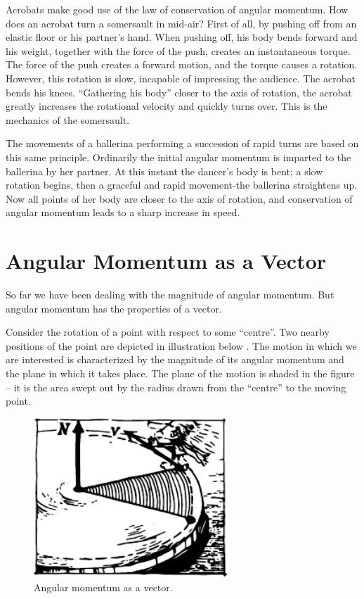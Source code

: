 Acrobats make good use of the law of conservation of angular momentum. How does an acrobat turn a somersault in mid-air? First of all, by pushing off from an elastic floor or his partner's hand. When pushing off, his body bends forward and his weight, together with the force of the push, creates an instantaneous torque. The force of the push creates a forward motion, and the torque causes a rotation. However, this rotation is slow, incapable of impressing the audience. The acrobat bends his knees. ``Gathering his body'' closer to the axis of rotation, the acrobat greatly increases the rotational velocity and quickly turns over. This is the mechanics of the somersault.

The movements of a ballerina performing a succession of rapid turns are based on this same principle. Ordinarily the initial angular momentum is imparted to the ballerina by her partner. At this instant the dancer's body is bent; a slow rotation begins, then a graceful and rapid movement-the ballerina straightens up. Now all points of her body are closer to the axis of rotation, and conservation of angular momentum leads to a sharp increase in speed.


\section{Angular Momentum as a Vector}
So far we have been dealing with the magnitude of
angular momentum. But angular momentum has the
properties of a vector.

Consider the rotation of a point with respect to some
``centre''. Two nearby positions of the point are depicted
in illustration below . The motion in which we are interested is
characterized by the magnitude of its angular momentum
and the plane in which it takes place. The plane of the
motion is shaded in the figure -- it is the area swept out
by the radius drawn from the ``centre'' to the moving
point.
 \begin{figure}[!ht]
 \centering
 \includegraphics[width=0.65\textwidth]{figures/fig-5-14.pdf}
 \caption{Angular momentum as a vector.}
 \label{fig-5-14}
 \end{figure}
 
